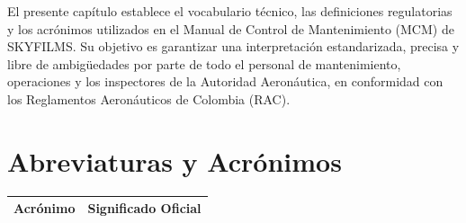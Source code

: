 El presente capítulo establece el vocabulario técnico, las definiciones regulatorias y los acrónimos utilizados en el Manual de Control de Mantenimiento (MCM) de SKYFILMS. Su objetivo es garantizar una interpretación estandarizada, precisa y libre de ambigüedades por parte de todo el personal de mantenimiento, operaciones y los inspectores de la Autoridad Aeronáutica, en conformidad con los Reglamentos Aeronáuticos de Colombia (RAC).

\section*{Abreviaturas y Acrónimos}

\begin{longtable}{|p{}|p{}|}
\hline
\rowcolor{gray!30}
\textbf{Acrónimo} & \textbf{Significado Oficial} \\ \hline
\endhead


\end{longtable}
